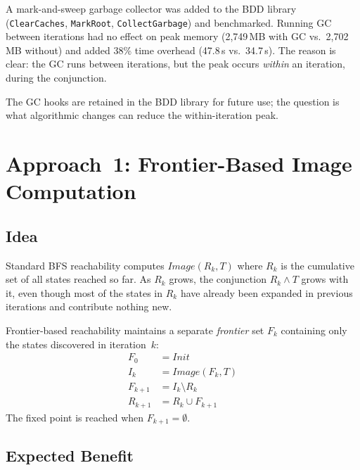 \documentclass[11pt]{article}
\begin{document}
A mark-and-sweep garbage collector was added to the BDD library
(\texttt{ClearCaches}, \texttt{MarkRoot}, \texttt{CollectGarbage})
and benchmarked.  Running GC between iterations had no effect on peak
memory (2,749\,MB with GC vs.\ 2,702\,MB without) and added 38\%
time overhead (47.8\,s vs.\ 34.7\,s).  The reason is clear:
the GC runs between iterations, but the peak occurs \emph{within}
an iteration, during the conjunction.

The GC hooks are retained in the BDD library for future use; the
question is what algorithmic changes can reduce the within-iteration peak.

\section{Approach~1: Frontier-Based Image Computation}

\subsection{Idea}

Standard BFS reachability computes $\mathit{Image}(R_k, T)$ where
$R_k$ is the cumulative set of all states reached so far.  As $R_k$
grows, the conjunction $R_k \wedge T$ grows with it, even though most
of the states in $R_k$ have already been expanded in previous iterations
and contribute nothing new.

Frontier-based reachability maintains a separate \emph{frontier} set
$F_k$ containing only the states discovered in iteration~$k$:
%
\begin{align}
F_0 &= \mathit{Init} \\
I_k &= \mathit{Image}(F_k, T) \\
F_{k+1} &= I_k \setminus R_k \\
R_{k+1} &= R_k \cup F_{k+1}
\end{align}
%
The fixed point is reached when $F_{k+1} = \emptyset$.

\subsection{Expected Benefit}
\end{document}
